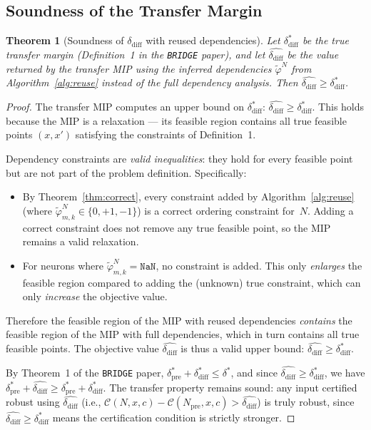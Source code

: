 \documentclass[11pt]{article}
\newtheorem{theorem}{Theorem}
\theoremstyle{definition}
\newcommand{\tool}{\texttt{BRIDGE}\xspace}
\newcommand{\conf}[3]{\mathcal{C}(#1,#2,#3)}
\newcommand{\xp}{x'}
\newcommand{\dD}{\delta_{\mathrm{diff}}}
\newcommand{\Npre}{N_{\mathrm{pre}}}
\begin{document}
\subsection{Soundness of the Transfer Margin}

\begin{theorem}[Soundness of $\dD$ with reused dependencies]
  \label{thm:sound}
  Let $\dD^*$ be the true transfer margin (Definition~1 in the \tool paper), and let $\hat{\dD}$ be the value returned by the transfer MIP using the inferred dependencies $\tilde{\varphi}^{N}$ from Algorithm~\ref{alg:reuse} instead of the full dependency analysis. Then $\hat{\dD} \ge \dD^*$.
\end{theorem}

\begin{proof}
  The transfer MIP computes an upper bound on $\dD^*$: $\hat{\dD} \ge \dD^*$. This holds because the MIP is a relaxation --- its feasible region contains all true feasible points $(x, \xp)$ satisfying the constraints of Definition~1.

  Dependency constraints are \emph{valid inequalities}: they hold for every feasible point but are not part of the problem definition. Specifically:
  \begin{itemize}
    \item By Theorem~\ref{thm:correct}, every constraint added by Algorithm~\ref{alg:reuse} (where $\tilde{\varphi}_{m,k}^{N} \in \{0, +1, -1\}$) is a correct ordering constraint for~$N$. Adding a correct constraint does not remove any true feasible point, so the MIP remains a valid relaxation.
    \item For neurons where $\tilde{\varphi}_{m,k}^{N} = \mathtt{NaN}$, no constraint is added. This only \emph{enlarges} the feasible region compared to adding the (unknown) true constraint, which can only \emph{increase} the objective value.
  \end{itemize}

  Therefore the feasible region of the MIP with reused dependencies \emph{contains} the feasible region of the MIP with full dependencies, which in turn contains all true feasible points. The objective value $\hat{\dD}$ is thus a valid upper bound: $\hat{\dD} \ge \dD^*$.

  By Theorem~1 of the \tool paper, $\delta^*_{\mathrm{pre}} + \dD^* \le \delta^*$, and since $\hat{\dD} \ge \dD^*$, we have $\delta^*_{\mathrm{pre}} + \hat{\dD} \ge \delta^*_{\mathrm{pre}} + \dD^*$. The transfer property remains sound: any input certified robust using $\hat{\dD}$ (i.e., $\conf{N}{x}{c} - \conf{\Npre}{x}{c} > \hat{\dD}$) is truly robust, since $\hat{\dD} \ge \dD^*$ means the certification condition is strictly stronger.
\end{proof}
\end{document}
